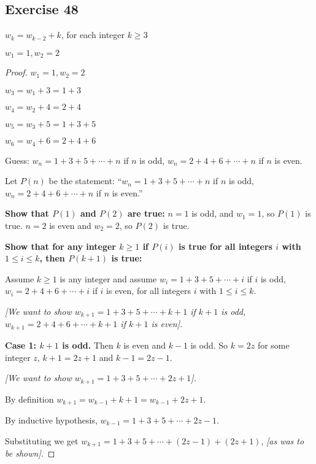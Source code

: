 \documentclass[14pt]{extarticle}
\newcommand{\dps}{\displaystyle}
\begin{document}
\subsection{Exercise 48}
\(w_k = w_{k-2} + k\), for each integer \(k \geq 3\)

\(w_1 = 1, w_2 = 2\)

\begin{proof}
    \(w_1 = 1, w_2 = 2\)

    \(w_3 = w_1 + 3 = 1 + 3\)

    \(w_4 = w_2 + 4 = 2 + 4\)

    \(w_5 = w_3 + 5 = 1 + 3 + 5\)

    \(w_6 = w_4 + 6 = 2 + 4 + 6\)

    Guess: \(w_n = 1 + 3 + 5 + \cdots + n\) if $n$ is odd, \(w_n = 2 + 4 + 6 + \cdots + n\) if $n$ is even.

    Let \(P(n)\) be the statement:
    ``\(w_n = 1 + 3 + 5 + \cdots + n\) if $n$ is odd,
    \(w_n = 2 + 4 + 6 + \cdots + n\) if $n$ is even.''

    {\bf Show that $P(1)$ and $P(2)$ are true:}
    $n = 1$ is odd, and \(w_1 = 1\), so $P(1)$ is true.
    $n = 2$ is even and \(w_2 = 2\), so $P(2)$ is true.

        {\bf Show that for any integer \(k \geq 1\) if $P(i)$ is true for all integers $i$ with \(1 \leq i \leq k\), then
            $P(k+1)$ is true:}

    Assume \(k \geq 1\) is any integer and assume
    \(w_i = 1 + 3 + 5 + \cdots + i\) if $i$ is odd,
    \(w_i = 2 + 4 + 6 + \cdots + i\) if $i$ is even,
    for all integers $i$ with \(1 \leq i \leq k\).

        {\it [We want to show
                \(w_{k+1} = 1 + 3 + 5 + \cdots + k+1\) if $k+1$ is odd,
                \(w_{k+1} = 2 + 4 + 6 + \cdots + k+1\) if $k+1$ is even].}

        {\bf Case 1: $k+1$ is odd.} Then $k$ is even and $k-1$ is odd.
    So $k = 2z$ for some integer $z$, $k+1 = 2z+1$ and $k-1 = 2z-1$.

        {\it [We want to show \(w_{k+1} = 1 + 3 + 5 + \cdots + 2z+1\)].}

    By definition \(w_{k+1} = w_{k-1} + k+1 = w_{k-1} + 2z+1\).

    By inductive hypothesis, \(\dps w_{k-1} = 1 + 3 + 5 + \cdots + 2z-1\).

    Substituting we get \(\dps w_{k+1} = 1 + 3 + 5 + \cdots + (2z-1) + (2z+1)\), {\it [as was to be shown].}


\end{proof}
\end{document}
